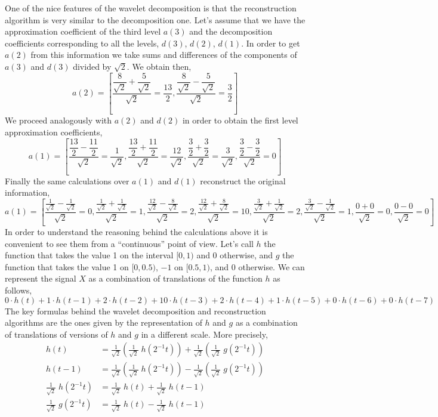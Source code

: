 One of the nice features of the wavelet decomposition is that the reconstruction algorithm is very similar to the decomposition one. Let's assume that we have the approximation coefficient of the third level $a(3)$ and the decomposition coefficients corresponding to all the levels, $d(3)$, $d(2)$, $d(1)$. In order to get $a(2)$ from this information we take sums and differences of the components of $a(3)$ and $d(3)$ divided by $\sqrt{2}$. We obtain then,
	\[
	a(2)=\left[\dfrac{\dfrac{8}{\sqrt{2}}+\dfrac{5}{\sqrt{2}}}{\sqrt{2}}= \dfrac{13}{2}, \dfrac{\dfrac{8}{\sqrt{2}} - \dfrac{5}{\sqrt{2}}}{\sqrt{2}}=\dfrac{3}{2} \right]
	\]
We proceed analogously with $a(2)$ and $d(2)$ in order to obtain the first level approximation coefficients,
	\[
	a(1)=\left[\dfrac{\dfrac{13}{2}-\dfrac{11}{2}}{\sqrt{2}}=\dfrac{1}{\sqrt{2}},\dfrac{\dfrac{13}{2}+\dfrac{11}{2}}{\sqrt{2}}=\dfrac{12}{\sqrt{2}},\dfrac{\dfrac{3}{2}+\dfrac{3}{2}}{\sqrt{2}}=\dfrac{3}{\sqrt{2}},\dfrac{\dfrac{3}{2}-\dfrac{3}{2}}{\sqrt{2}}=0\right]
	\]
Finally the same calculations over $a(1)$ and $d(1)$ reconstruct the original information,
	\[
	a(1)=\left[\frac{\frac{1}{\sqrt{2}}-\frac{1}{\sqrt{2}}}{\sqrt{2}}=0,\frac{\frac{1}{\sqrt{2}}+\frac{1}{\sqrt{2}}}{\sqrt{2}}=1,\frac{\frac{12}{\sqrt{2}}-\frac{8}{\sqrt{2}}}{\sqrt{2}}=2,\frac{\frac{12}{\sqrt{2}}+\frac{8}{\sqrt{2}}}{\sqrt{2}}=10,\frac{\frac{3}{\sqrt{2}}+\frac{1}{\sqrt{2}}}{\sqrt{2}}=2,\frac{\frac{3}{\sqrt{2}}-\frac{1}{\sqrt{2}}}{\sqrt{2}}=1,\frac{0+0}{\sqrt{2}}=0,\frac{0-0}{\sqrt{2}}=0 \right]
	\]
In order to understand the reasoning behind the calculations above it is convenient to see them from a ``continuous'' point of view. Let's call $h$ the function that takes the value 1 on the interval $[0,1)$ and 0 otherwise, and $g$ the function that takes the value 1 on $[0,0.5)$, $-1$ on $[0.5,1)$, and 0 otherwise. We can represent the signal $X$ as a combination of translations of the function $h$ as follows,
	\[
	0 \cdot h(t)+1 \cdot h(t-1)+2 \cdot h(t-2)+10 \cdot h(t-3)+ 2 \cdot h(t-4)+1 \cdot h(t-5)+0 \cdot h(t-6)+ 0 \cdot h(t-7)
	\]
The key formulas behind the wavelet decomposition and reconstruction algorithms are the ones given by the representation of $h$ and $g$ as a combination of translations of versions of $h$ and $g$ in a different scale. More precisely,
	\[
	\begin{split}
	h(t)&=\frac{1}{\sqrt{2}} \left( \frac{1}{\sqrt{2}} \;h(2^{-1}t) \right)+ \frac{1}{\sqrt{2}} \left( \frac{1}{\sqrt{2}} \; g(2^{-1}t) \right) \\
	h(t-1)&=\frac{1}{\sqrt{2}} \left( \frac{1}{\sqrt{2}} \; h(2^{-1}t) \right) - \frac{1}{\sqrt{2}} \left( \frac{1}{\sqrt{2}} \; g(2^{-1}t) \right) \\
	\frac{1}{\sqrt{2}}\; h(2^{-1}t)&= \frac{1}{\sqrt{2}}\; h(t)+\frac{1}{\sqrt{2}} \; h(t-1) \\
	\frac{1}{\sqrt{2}} \; g(2^{-1}t)&= \frac{1}{\sqrt{2}} \; h(t)- \frac{1}{\sqrt{2}} \; h(t-1)
	\end{split}
	\]

